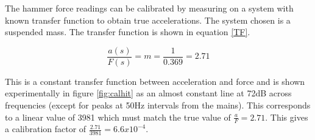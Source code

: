 \documentclass[twoside,onecolumn]{article}
\begin{document}
The hammer force readings can be calibrated by measuring on a system with known transfer function to obtain true accelerations. The system chosen is a suspended mass. The transfer function is shown in equation \ref{TF}.


\begin{equation}
\label{TF}
\frac{a(s)}{F(s)}=m = \frac{1}{0.369}=2.71
\end{equation}

This is a constant transfer function between acceleration and force and is shown experimentally in figure \ref{fig:calhit} as an almost constant line at 72dB across frequencies (except for peaks at 50Hz intervals from the mains). This corresponds to a linear value of 3981 which must match the true value of $\frac{a}{F}=2.71$. This gives a calibration factor of $\frac{2.71}{3981}=6.6x10^{-4}$.  

\end{document}
